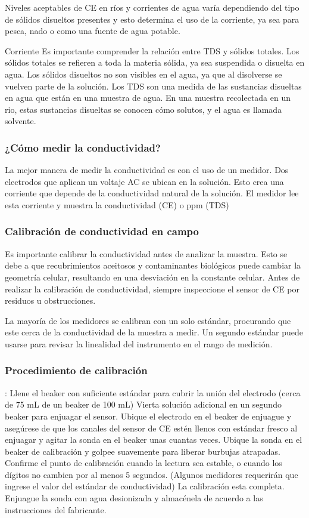 Niveles aceptables de CE en ríos y corrientes de agua varía dependiendo del tipo de sólidos disueltos presentes y esto determina el uso de la corriente, ya sea para pesca, nado o como una fuente de agua potable.


Corriente
Es importante comprender la relación entre TDS y sólidos totales. Los sólidos totales se refieren a toda la materia sólida, ya sea suspendida o disuelta en agua. 
Los sólidos disueltos no son visibles en el agua, ya que al disolverse se vuelven parte de la solución. 
Los TDS son una medida de las sustancias disueltas en agua que están en una muestra de agua. 
En una muestra recolectada en un rio, estas sustancias disueltas se conocen cómo solutos, y el agua es llamada solvente.

\subsubsection{¿Cómo medir la conductividad?}
La mejor manera de medir la conductividad es con el uso de un medidor. 
Dos electrodos que aplican un voltaje AC se ubican en la solución. 
Esto crea una corriente que depende de la conductividad natural de la solución. 
El medidor lee esta corriente y muestra la conductividad (CE) o ppm (TDS)

\subsubsection{Calibración de conductividad en campo}
Es importante calibrar la conductividad antes de analizar la muestra. 
Esto se debe a que recubrimientos aceitosos y contaminantes biológicos puede cambiar la geometría celular, resultando en una desviación en la constante celular. 
Antes de realizar la calibración de conductividad, siempre inspeccione el sensor de CE por residuos u obstrucciones.

La mayoría de los medidores se calibran con un solo estándar, procurando que este cerca de la conductividad de la muestra a medir. 
Un segundo estándar puede usarse para revisar la linealidad del instrumento en el rango de medición.

\subsubsection{Procedimiento de calibración}:
Llene el beaker con suficiente estándar para cubrir la unión del electrodo (cerca de 75 mL de un beaker de 100 mL) 
Vierta solución adicional en un segundo beaker para enjuagar el sensor.
Ubique el electrodo en el beaker de enjuague y asegúrese de que los canales del sensor de CE estén llenos con estándar fresco al enjuagar y agitar la sonda en el beaker unas cuantas veces.
Ubique la sonda en el beaker de calibración y golpee suavemente para liberar burbujas atrapadas.
Confirme el punto de calibración cuando la lectura sea estable, o cuando los dígitos no cambien por al menos 5 segundos. (Algunos medidores requerirán que ingrese el valor del estándar de conductividad)
La calibración esta completa. Enjuague la sonda con agua desionizada y almacénela de acuerdo a las instrucciones del fabricante.


